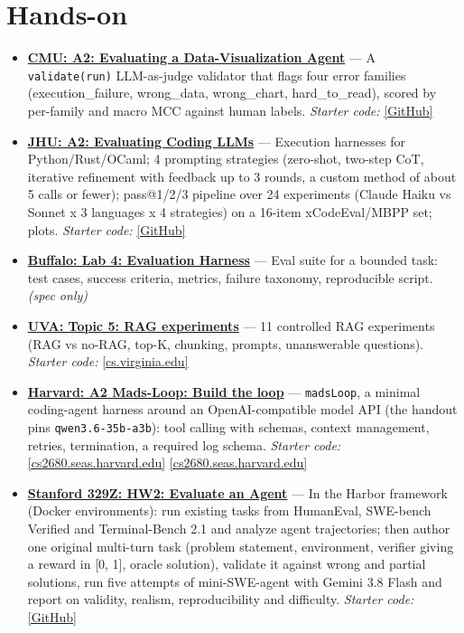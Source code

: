 \documentclass[10pt,oneside]{report}
\begin{document}
\section{Hands-on}
\begin{itemize}
\item \hyperlink{asg-CMU-2}{\textbf{CMU: A2: Evaluating a Data-Visualization Agent}} --- A \texttt{validate(run)} LLM-as-judge validator that flags four error families (execution\_\allowbreak{}failure, wrong\_\allowbreak{}data, wrong\_\allowbreak{}chart, hard\_\allowbreak{}to\_\allowbreak{}read), scored by per-family and macro MCC against human labels. \textit{Starter code:} \href{https://github.com/cmu-agents/assignment-2}{[GitHub]}
\item \hyperlink{asg-JHU-2}{\textbf{JHU: A2: Evaluating Coding LLMs}} --- Execution harnesses for Python/Rust/OCaml; 4 prompting strategies (zero-shot, two-step CoT, iterative refinement with feedback up to 3 rounds, a custom method of about 5 calls or fewer); pass@1/2/3 pipeline over 24 experiments (Claude Haiku vs Sonnet x 3 languages x 4 strategies) on a 16-item xCodeEval/MBPP set; plots. \textit{Starter code:} \href{https://github.com/machine-programming/assignment-2}{[GitHub]}
\item \hyperlink{asg-UB-4}{\textbf{Buffalo: Lab 4: Evaluation Harness}} --- Eval suite for a bounded task: test cases, success criteria, metrics, failure taxonomy, reproducible script. \textit{(spec only)}
\item \hyperlink{asg-UVA-5}{\textbf{UVA: Topic 5: RAG experiments}} --- 11 controlled RAG experiments (RAG vs no-RAG, top-K, chunking, prompts, unanswerable questions). \textit{Starter code:} \href{https://www.cs.virginia.edu/\%7Ermw7my/Courses/AgenticAISpring2026/Topic5RAG/rag.html}{[cs.virginia.edu]}
\item \hyperlink{asg-HARV-2}{\textbf{Harvard: A2 Mads-Loop: Build the loop}} --- \texttt{madsLoop}, a minimal coding-agent harness around an OpenAI-compatible model API (the handout pins \texttt{qwen3.\allowbreak{}6-35b-a3b}): tool calling with schemas, context management, retries, termination, a required log schema. \textit{Starter code:} \href{https://cs2680.seas.harvard.edu/assignments/assignment2.tar.gz}{[cs2680.seas.harvard.edu]} \href{https://cs2680.seas.harvard.edu/assignments/assignment2.html}{[cs2680.seas.harvard.edu]}
\item \hyperlink{asg-S329Z-2}{\textbf{Stanford 329Z: HW2: Evaluate an Agent}} --- In the Harbor framework (Docker environments): run existing tasks from HumanEval, SWE-bench Verified and Terminal-Bench 2.1 and analyze agent trajectories; then author one original multi-turn task (problem statement, environment, verifier giving a reward in [0, 1], oracle solution), validate it against wrong and partial solutions, run five attempts of mini-SWE-agent with Gemini 3.8 Flash and report on validity, realism, reproducibility and difficulty. \textit{Starter code:} \href{https://github.com/cs329z/assignment2-evals}{[GitHub]}
\end{itemize}
\end{document}
